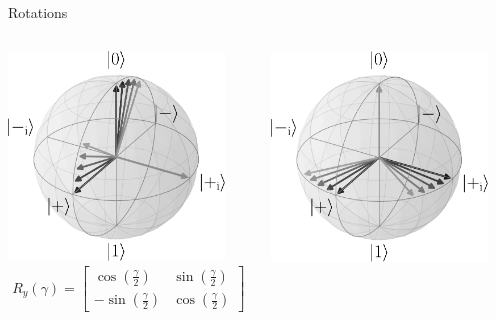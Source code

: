 \begin{frame}{Rotations}
\begin{columns}
\begin{column}[t]{0.35\textwidth}
\begin{center}
\includegraphics[width=0.9\textwidth]{pics/Ry} \\
$$
R_y(\gamma) = 
\begin{bmatrix}
\cos\left(\frac{\gamma}{2}\right) & \sin\left(\frac{\gamma}{2}\right)         \\
-\sin\left(\frac{\gamma}{2}\right) & \cos\left(\frac{\gamma}{2}\right)
\end{bmatrix}
$$
\end{center}
\end{column}
\begin{column}[t]{0.35\textwidth}
\begin{center}
\includegraphics[width=0.9\textwidth]{pics/Rz} \\

\end{center}
\end{column}
\end{columns}
\end{frame}
